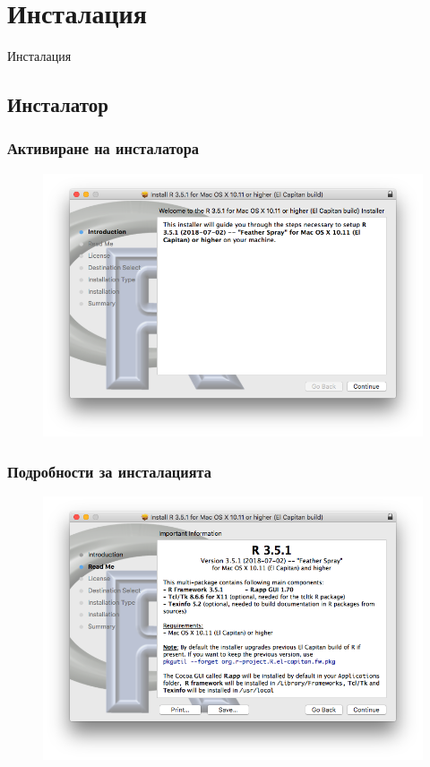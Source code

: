 \documentclass{beamer}
\begin{document}
\section{Инсталация}

\begin{frame}
\center \huge{Инсталация}
\end{frame}

\subsection{Инсталатор}

\begin{frame}
\frametitle{Активиране на инсталатора}
\begin{figure}[]\includegraphics[width=\textwidth,height=0.75\textheight]{pic0006}\end{figure}
\end{frame}

\begin{frame}
\frametitle{Подробности за инсталацията}
\begin{figure}[]\includegraphics[width=\textwidth,height=0.75\textheight]{pic0007}\end{figure}
\end{frame}
\end{document}
